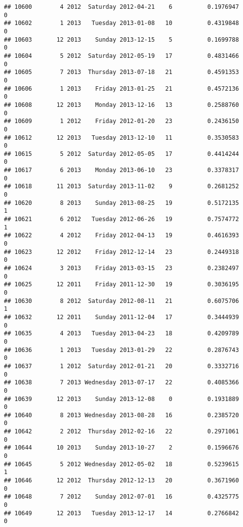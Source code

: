 \documentclass[
]{article}
\begin{document}
\begin{verbatim}
## 10600        4 2012  Saturday 2012-04-21    6          0.1976947             0
## 10602        1 2013   Tuesday 2013-01-08   10          0.4319848             0
## 10603       12 2013    Sunday 2013-12-15    5          0.1699788             0
## 10604        5 2012  Saturday 2012-05-19   17          0.4831466             0
## 10605        7 2013  Thursday 2013-07-18   21          0.4591353             0
## 10606        1 2013    Friday 2013-01-25   21          0.4572136             0
## 10608       12 2013    Monday 2013-12-16   13          0.2588760             0
## 10609        1 2012    Friday 2012-01-20   23          0.2436150             0
## 10612       12 2013   Tuesday 2013-12-10   11          0.3530583             0
## 10615        5 2012  Saturday 2012-05-05   17          0.4414244             0
## 10617        6 2013    Monday 2013-06-10   23          0.3378317             0
## 10618       11 2013  Saturday 2013-11-02    9          0.2681252             0
## 10620        8 2013    Sunday 2013-08-25   19          0.5172135             1
## 10621        6 2012   Tuesday 2012-06-26   19          0.7574772             1
## 10622        4 2012    Friday 2012-04-13   19          0.4616393             0
## 10623       12 2012    Friday 2012-12-14   23          0.2449318             0
## 10624        3 2013    Friday 2013-03-15   23          0.2382497             0
## 10625       12 2011    Friday 2011-12-30   19          0.3036195             0
## 10630        8 2012  Saturday 2012-08-11   21          0.6075706             1
## 10632       12 2011    Sunday 2011-12-04   17          0.3444939             0
## 10635        4 2013   Tuesday 2013-04-23   18          0.4209789             0
## 10636        1 2013   Tuesday 2013-01-29   22          0.2876743             0
## 10637        1 2012  Saturday 2012-01-21   20          0.3332716             0
## 10638        7 2013 Wednesday 2013-07-17   22          0.4085366             0
## 10639       12 2013    Sunday 2013-12-08    0          0.1931889             0
## 10640        8 2013 Wednesday 2013-08-28   16          0.2385720             0
## 10642        2 2012  Thursday 2012-02-16   22          0.2971061             0
## 10644       10 2013    Sunday 2013-10-27    2          0.1596676             0
## 10645        5 2012 Wednesday 2012-05-02   18          0.5239615             1
## 10646       12 2012  Thursday 2012-12-13   20          0.3671960             0
## 10648        7 2012    Sunday 2012-07-01   16          0.4325775             0
## 10649       12 2013   Tuesday 2013-12-17   14          0.2766842             0

\end{verbatim}
\end{document}
